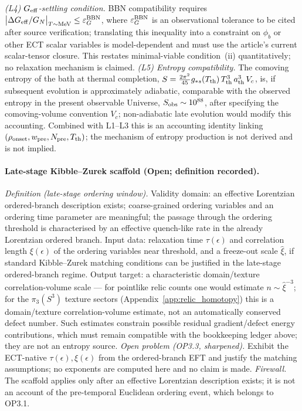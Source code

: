 \emph{(L4) $G_{\rm eff}$-settling condition.}
BBN compatibility requires
$\bigl|\Delta G_{\rm eff}/G_N\bigr|_{T\sim{\rm MeV}}
\le\varepsilon_G^{\rm BBN}$, where $\varepsilon_G^{\rm BBN}$ is an
observational tolerance to be cited after source verification;
translating this inequality into a constraint on $\phi_b$ or other
ECT scalar variables is model-dependent and must use the article's
current scalar-tensor closure.
This restates minimal-viable condition~(ii) quantitatively; no
relaxation mechanism is claimed.
\emph{(L5) Entropy compatibility.}
The comoving entropy of the bath at thermal completion,
$S=\tfrac{2\pi^2}{45}g_{*s}(T_{\rm th})\,T_{\rm th}^3\,
a_{\rm th}^3\,V_c$, is, if subsequent evolution is approximately
adiabatic, comparable with the observed entropy in the present
observable Universe, $S_{\rm obs}\sim10^{88}$, after specifying
the comoving-volume convention $V_c$; non-adiabatic late evolution
would modify this accounting.
Combined with L1--L3 this is an accounting identity linking
$(\rho_{\rm onset},w_{\rm pre},N_{\rm pre},T_{\rm th})$; the
mechanism of entropy production is not derived and is not implied.

\paragraph{Late-stage Kibble--Zurek scaffold (Open; definition
recorded).}
\emph{Definition (late-stage ordering window).}
Validity domain: an effective Lorentzian ordered-branch
description exists; coarse-grained ordering variables and an
ordering time parameter are meaningful; the passage through the
ordering threshold is characterised by an effective quench-like
rate in the already Lorentzian ordered branch.
Input data: relaxation time $\tau(\epsilon)$ and correlation
length $\xi(\epsilon)$ of the ordering variables near threshold,
and a freeze-out scale $\hat\xi$, if standard Kibble--Zurek
matching conditions can be justified in the late-stage
ordered-branch regime.
Output target: a characteristic domain/texture correlation-volume
scale --- for pointlike relic counts one would estimate
$n\sim\hat\xi^{-3}$; for the $\pi_3(S^3)$ texture sectors
(Appendix~\ref{app:relic_homotopy}) this is a domain/texture
correlation-volume estimate, not an automatically conserved defect
number.
Such estimates constrain possible residual gradient/defect energy
contributions, which must remain compatible with the bookkeeping
ledger above; they are not an entropy source.
\emph{Open problem (OP3.3, sharpened).}
Exhibit the ECT-native $\tau(\epsilon),\xi(\epsilon)$ from the
ordered-branch EFT and justify the matching assumptions; no
exponents are computed here and no claim is made.
\emph{Firewall.}
The scaffold applies only after an effective Lorentzian
description exists; it is not an account of the pre-temporal
Euclidean ordering event, which belongs to OP3.1.

